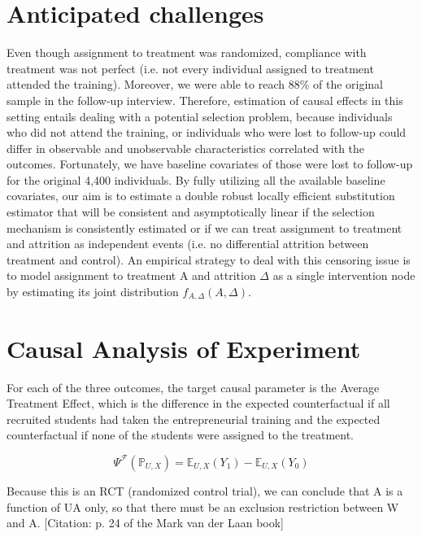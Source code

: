 \section{Anticipated challenges}
\label{sec:antic-chall}

Even though assignment to treatment was randomized, compliance with treatment was not perfect (i.e. not every individual assigned to treatment attended the training). Moreover, we were able to reach 88\% of the original sample in the follow-up interview. Therefore, estimation of causal effects in this setting entails dealing with a potential selection problem, because individuals who did not attend the training, or individuals who were lost to follow-up could differ in observable and unobservable characteristics correlated with the outcomes. Fortunately, we have baseline covariates of those were lost to follow-up for the original 4,400 individuals. By fully utilizing all the available baseline covariates, our aim is to estimate a double robust locally efficient substitution estimator that will be consistent and asymptotically linear if the selection mechanism is consistently estimated or if we can treat assignment to treatment and attrition as independent events (i.e. no differential attrition between treatment and control).\cite{nano1} 
An empirical strategy to deal with this censoring issue is to model assignment to treatment A and attrition $\Delta$ as a single intervention node by estimating its joint distribution $f_{A,\Delta}(A,\Delta)$.


\section{Causal Analysis of Experiment}
\label{sec:caus-analys-exper}

For each of the three outcomes, the target causal parameter is the Average Treatment Effect, which is the difference in the expected counterfactual if all recruited students had taken the entrepreneurial training and the expected counterfactual if none of the students were assigned to the treatment.

\[ \Psi^{\mathcal{F}}(\mathbb{P}_{U,X}) = \mathbb{E}_{U,X}(Y_1) - \mathbb{E}_{U,X}(Y_0)  \]

Because this is an RCT (randomized control trial), we can conclude that A is a function of UA only, so that there must be an exclusion restriction between W and A. [Citation: p. 24 of the Mark van der Laan book] \\

